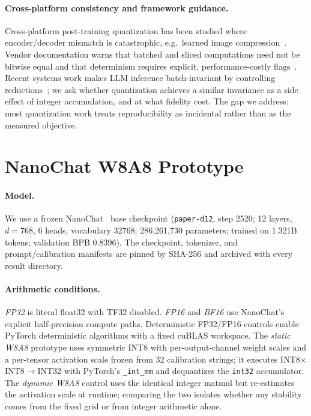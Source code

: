\documentclass[10pt,twocolumn]{article}
\begin{document}
\paragraph{Cross-platform consistency and framework guidance.} Cross-platform
post-training quantization has been studied where encoder/decoder mismatch is
catastrophic, e.g.\ learned image compression~\cite{yu2022crossplatform}. Vendor
documentation warns that batched and sliced computations need not be bitwise
equal and that determinism requires explicit, performance-costly
flags~\cite{pytorch_numerical,pytorch_reproducibility}. Recent systems work makes
LLM inference batch-invariant by controlling reductions~\cite{he2025nondeterminism};
we ask whether quantization achieves a similar invariance as a side effect of
integer accumulation, and at what fidelity cost. The gap we address: most
quantization work treats reproducibility as incidental rather than as the
measured objective.

\section{NanoChat W8A8 Prototype}
\paragraph{Model.} We use a frozen NanoChat~\cite{karpathy2025nanochat} base
checkpoint (\texttt{paper-d12}, step 2520; 12 layers, $d{=}768$, 6 heads,
vocabulary 32768; 286{,}261{,}730 parameters; trained on 1.321B tokens; validation
BPB 0.8396). The checkpoint, tokenizer, and prompt/calibration manifests are
pinned by SHA-256 and archived with every result directory.

\paragraph{Arithmetic conditions.} \emph{FP32} is literal float32 with TF32
disabled. \emph{FP16} and \emph{BF16} use NanoChat's explicit half-precision
compute paths. Deterministic FP32/FP16 controls enable PyTorch deterministic
algorithms with a fixed cuBLAS workspace. The \emph{static W8A8} prototype uses
symmetric INT8 with per-output-channel weight scales and a per-tensor activation
scale frozen from 32 calibration strings; it executes
INT8$\times$INT8$\rightarrow$INT32 with PyTorch's \texttt{\_int\_mm} and
dequantizes the \texttt{int32} accumulator. The \emph{dynamic W8A8} control uses
the identical integer matmul but re-estimates the activation scale at runtime;
comparing the two isolates whether any stability comes from the fixed grid or
from integer arithmetic alone.
\end{document}

